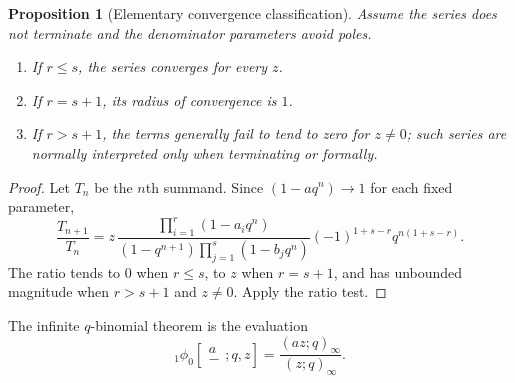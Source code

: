 \documentclass[11pt,a4paper,oneside,openany]{book}
\newtheorem{proposition}[proposition]{Proposition}
\theoremstyle{definition}
\theoremstyle{remark}
\begin{document}
\begin{proposition}[Elementary convergence classification]\label{prop:phi-convergence}
Assume the series does not terminate and the denominator parameters avoid poles.
\begin{enumerate}[label=\textup{(\roman*)}]
\item If $r\le s$, the series converges for every $z$.
\item If $r=s+1$, its radius of convergence is $1$.
\item If $r>s+1$, the terms generally fail to tend to zero for $z\ne0$; such series are normally interpreted only when terminating or formally.
\end{enumerate}
\end{proposition}

\begin{proof}
Let $T_n$ be the $n$th summand.  Since $(1-aq^n)\to1$ for each fixed parameter,
\[
 \frac{T_{n+1}}{T_n}
 =z\,\frac{\prod_{i=1}^{r}(1-a_iq^n)}
 {(1-q^{n+1})\prod_{j=1}^{s}(1-b_jq^n)}
 (-1)^{1+s-r}q^{n(1+s-r)}.
\]
The ratio tends to $0$ when $r\le s$, to $z$ when $r=s+1$, and has unbounded magnitude when $r>s+1$ and $z\ne0$.  Apply the ratio test.
\end{proof}

The infinite $q$-binomial theorem is the evaluation
\[
 {}_1\phi_0\!\left[\begin{matrix}a\\-\end{matrix};q,z\right]
 =\frac{(az;q)_\infty}{(z;q)_\infty}.
\]


\end{document}
